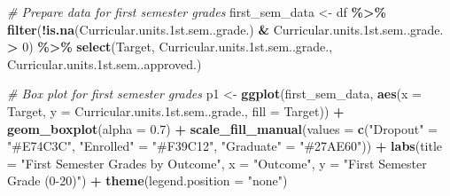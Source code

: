 \documentclass[
]{article}
\newenvironment{Shaded}{\begin{snugshade}}{\end{snugshade}}
\newcommand{\AttributeTok}[1]{\textcolor[rgb]{0.13,0.29,0.53}{#1}}
\newcommand{\CommentTok}[1]{\textcolor[rgb]{0.56,0.35,0.01}{\textit{#1}}}
\newcommand{\DecValTok}[1]{\textcolor[rgb]{0.00,0.00,0.81}{#1}}
\newcommand{\FloatTok}[1]{\textcolor[rgb]{0.00,0.00,0.81}{#1}}
\newcommand{\FunctionTok}[1]{\textcolor[rgb]{0.13,0.29,0.53}{\textbf{#1}}}
\newcommand{\NormalTok}[1]{#1}
\newcommand{\OtherTok}[1]{\textcolor[rgb]{0.56,0.35,0.01}{#1}}
\newcommand{\SpecialCharTok}[1]{\textcolor[rgb]{0.81,0.36,0.00}{\textbf{#1}}}
\newcommand{\StringTok}[1]{\textcolor[rgb]{0.31,0.60,0.02}{#1}}
\newcounter{none} %
\begin{document}
\begin{Shaded}
\begin{Highlighting}[]
\CommentTok{\# Prepare data for first semester grades}
\NormalTok{first\_sem\_data }\OtherTok{\textless{}{-}}\NormalTok{ df }\SpecialCharTok{\%\textgreater{}\%}
  \FunctionTok{filter}\NormalTok{(}\SpecialCharTok{!}\FunctionTok{is.na}\NormalTok{(Curricular.units}\FloatTok{.1}\NormalTok{st.sem..grade.) }\SpecialCharTok{\&}
\NormalTok{         Curricular.units}\FloatTok{.1}\NormalTok{st.sem..grade. }\SpecialCharTok{\textgreater{}} \DecValTok{0}\NormalTok{) }\SpecialCharTok{\%\textgreater{}\%}
  \FunctionTok{select}\NormalTok{(Target, Curricular.units}\FloatTok{.1}\NormalTok{st.sem..grade.,}
\NormalTok{         Curricular.units}\FloatTok{.1}\NormalTok{st.sem..approved.)}

\CommentTok{\# Box plot for first semester grades}
\NormalTok{p1 }\OtherTok{\textless{}{-}} \FunctionTok{ggplot}\NormalTok{(first\_sem\_data, }\FunctionTok{aes}\NormalTok{(}\AttributeTok{x =}\NormalTok{ Target, }\AttributeTok{y =}\NormalTok{ Curricular.units}\FloatTok{.1}\NormalTok{st.sem..grade., }\AttributeTok{fill =}\NormalTok{ Target)) }\SpecialCharTok{+}
  \FunctionTok{geom\_boxplot}\NormalTok{(}\AttributeTok{alpha =} \FloatTok{0.7}\NormalTok{) }\SpecialCharTok{+}
  \FunctionTok{scale\_fill\_manual}\NormalTok{(}\AttributeTok{values =} \FunctionTok{c}\NormalTok{(}\StringTok{"Dropout"} \OtherTok{=} \StringTok{"\#E74C3C"}\NormalTok{,}
                                \StringTok{"Enrolled"} \OtherTok{=} \StringTok{"\#F39C12"}\NormalTok{,}
                                \StringTok{"Graduate"} \OtherTok{=} \StringTok{"\#27AE60"}\NormalTok{)) }\SpecialCharTok{+}
  \FunctionTok{labs}\NormalTok{(}\AttributeTok{title =} \StringTok{"First Semester Grades by Outcome"}\NormalTok{,}
       \AttributeTok{x =} \StringTok{"Outcome"}\NormalTok{, }\AttributeTok{y =} \StringTok{"First Semester Grade (0{-}20)"}\NormalTok{) }\SpecialCharTok{+}
  \FunctionTok{theme}\NormalTok{(}\AttributeTok{legend.position =} \StringTok{"none"}\NormalTok{)}


\end{Highlighting}
\end{Shaded}
\end{document}
